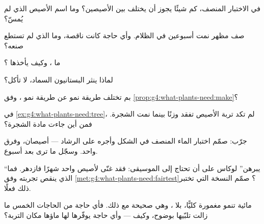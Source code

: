 \begin{exercise}[$\star$]\label{exo:g4:what-plants-need:2}
في الاختبار المنصف، كم شيئًا يجوز أن يختلف بين الأصيصين؟ وما اسم
الأصيص الذي لم يُمسّ؟
\end{exercise}

\begin{exercise}[$\star$]\label{exo:g4:what-plants-need:3}
صف مظهر  نمت أسبوعين في الظلام. وأي حاجة كانت ناقصة، وما الذي
لم تستطع صنعه؟
\end{exercise}

\begin{exercise}[$\star$]\label{exo:g4:what-plants-need:4}
ما ، وكيف يأخذها ؟
\end{exercise}

\begin{exercise}[$\star$]\label{exo:g4:what-plants-need:5}
لماذا ينثر البستانيون السماد،  لا تأكل؟
\end{exercise}

\begin{exercise}[$\star$]\label{exo:g4:what-plants-need:6}
بم تختلف طريقة نمو  عن طريقة نمو ، وفق
\cref{prop:g4:what-plants-need:make}؟
\end{exercise}

\begin{exercise}[$\star$]\label{exo:g4:what-plants-need:7}
في \cref{ex:g4:what-plants-need:tree}، لم تكد تربة الأصيص تفقد
وزنًا بينما نمت الشجرة. فمن أين جاءت مادة الشجرة؟
\end{exercise}

\begin{exercise}[$\star$]\label{exo:g4:what-plants-need:8}
جرّب: صمّم اختبار الماء المنصف في الشكل وأجره على الرشاد ---
أصيصان، وفرق واحد. وسجّل ما ترى بعد أسبوع.
\end{exercise}

\begin{exercise}[$\star\star$]\label{exo:g4:what-plants-need:9}
``يبرهن'' لوكاس على أن  تحتاج إلى الموسيقى: فقد غنّى
لأصيص واحد شهرًا فازدهر. فما الذي ينقص تجربته وفق
\cref{met:g4:what-plants-need:fairtest}؟ صمّم النسخة التي تختبر
ذلك فعلًا.
\end{exercise}

\begin{exercise}[$\star\star$]\label{exo:g4:what-plants-need:10}
 مائية تنمو مغمورة كليًّا، بلا ، وهي صحيحة مع ذلك. فأي
حاجة من الحاجات الخمس ما زالت تلبّيها بوضوح، وكيف --- وأي حاجة
يوفّرها لها ماؤها مكان التربة؟
\end{exercise}

